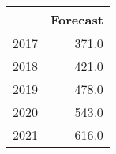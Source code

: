 \begin{tabular}{lr}
\toprule
{} &  Forecast \\
\midrule
2017 &     371.0 \\
2018 &     421.0 \\
2019 &     478.0 \\
2020 &     543.0 \\
2021 &     616.0 \\
\bottomrule
\end{tabular}
